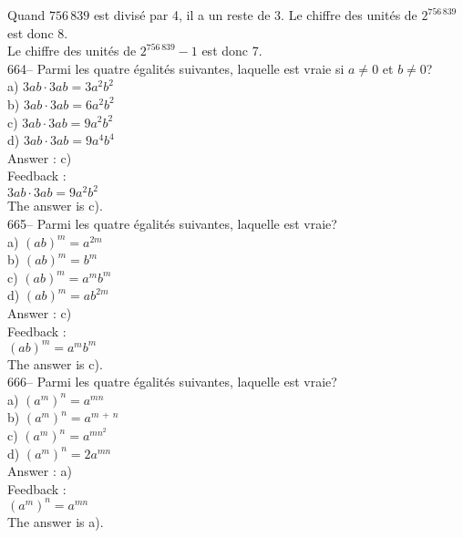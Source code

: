 ﻿\documentclass[letterpaper, 12pt]{article}
\begin{document}
Quand $756\,839$ est divis\'e par 4, il a un reste de 3.  Le chiffre des
unit\'es de $2^{756\,839}$ est donc 8.\\
Le chiffre des unit\'es de $2^{756\,839}-1$ est donc 7.  \\

664-- Parmi les quatre \'egalit\'es suivantes, laquelle est vraie si
$a\neq0$ et $b \neq 0$?\\
a) $3ab\cdot3ab=3a^{2}b^{2}$\\
b) $3ab\cdot3ab=6a^{2}b^{2}$\\
c) $3ab\cdot3ab=9a^{2}b^{2}$\\
d) $3ab\cdot3ab= 9a^{4}b^{4}$\\

Answer : c)\\

Feedback : \\
$3ab\cdot3ab=9a^{2}b^{2}$\\
The answer is c).\\

665-- Parmi les quatre \'egalit\'es suivantes, laquelle est vraie?\\
a) $\left( ab\right) ^m=a^{2m}$\\
b) $\left( ab\right) ^m=b^{m}$\\
c) $\left( ab\right) ^m=a^{m}b^{m}$\\
d) $\left( ab\right) ^m=ab^{2m}$\\

Answer : c)\\

Feedback : \\
$\left( ab\right) ^m=a^{m}b^{m}$\\
The answer is c).\\

666-- Parmi les quatre \'egalit\'es suivantes, laquelle est vraie?\\
a) $\left( a^{m}\right)^{n}=a^{mn}$ \\
b) $\left( a^{m}\right)^{n}=a^{m\,+\,n}$ \\
c) $\left( a^{m}\right)^{n}=a^{mn^{2}}$ \\
d) $\left( a^{m}\right)^{n}=2a^{mn}$ \\

Answer : a)\\

Feedback : \\
$\left( a^{m}\right)^{n}=a^{mn}$ \\
The answer is a).\\
\end{document}

